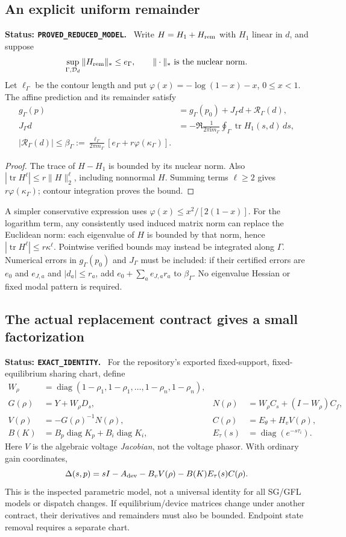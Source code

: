 \documentclass[11pt]{article}
\newcommand{\diag}{\operatorname{diag}}
\newcommand{\ii}{\mathrm{i}}
\newcommand{\status}[1]{\par\smallskip\noindent\textbf{Status: \texttt{#1}.}\ }
\begin{document}
\subsection{An explicit uniform remainder}
\status{PROVED\_REDUCED\_MODEL}
Write $H=H_1+H_{\rm rem}$ with $H_1$ linear in $d$, and suppose
\[
 \sup_{\Gamma,\mathcal D_d}\|H_{\rm rem}\|_*
 \le e_\Gamma,\qquad \|\cdot\|_* \text{ is the nuclear norm}.
\]
Let $\ell_\Gamma$ be the contour length and put
$\varphi(x)=-\log(1-x)-x$, $0\le x<1$.
The affine prediction and its remainder satisfy
\begin{align}
 g_\Gamma(p)&=g_\Gamma(p_0)+J_\Gamma d+\mathcal R_\Gamma(d),\\
 J_\Gamma d&=-\Re\frac{1}{2\pi\ii m_\Gamma}
                     \oint_\Gamma\operatorname{tr}H_1(s,d)\,ds,\\
 \boxed{|\mathcal R_\Gamma(d)|\le\beta_\Gamma
 :=\frac{\ell_\Gamma}{2\pi m_\Gamma}
       [e_\Gamma+r\varphi(\kappa_\Gamma)] .}
 \label{eq:regional-remainder}
\end{align}
\begin{proof}
The trace of $H-H_1$ is bounded by its nuclear norm.
Also $|\operatorname{tr}H^\ell|\le r\|H\|_2^\ell$,
including nonnormal $H$. Summing terms $\ell\ge2$ gives
$r\varphi(\kappa_\Gamma)$; contour integration proves the bound.
\end{proof}
A simpler conservative expression uses
$\varphi(x)\le x^2/[2(1-x)]$.
For the logarithm term, any consistently used induced matrix norm
can replace the Euclidean norm: each eigenvalue of $H$ is bounded
by that norm, hence $|\operatorname{tr}H^\ell|\le r\kappa^\ell$.
Pointwise verified bounds may instead be integrated along $\Gamma$.
Numerical errors in $g_\Gamma(p_0)$ and $J_\Gamma$ must be included:
if their certified errors are $e_0$ and $e_{J,a}$ and
$|d_a|\le r_a$, add $e_0+\sum_a e_{J,a}r_a$ to $\beta_\Gamma$.
No eigenvalue Hessian or fixed modal pattern is required.

\subsection{The actual replacement contract gives a small factorization}
\status{EXACT\_IDENTITY}
For the repository's exported fixed-support, fixed-equilibrium sharing
chart, define
\begin{align*}
 W_\rho&=\diag(1-\rho_1,1-\rho_1,\ldots,1-\rho_n,1-\rho_n),\\
 G(\rho)&=Y+W_\rho D_s,&
 N(\rho)&=W_\rho C_s+(I-W_\rho)C_f,\\
 V(\rho)&=-G(\rho)^{-1}N(\rho),&
 C(\rho)&=E_\theta+H_vV(\rho),\\
 B(K)&=B_p\diag K_p+B_i\diag K_i,&
 E_\tau(s)&=\diag(e^{-s\tau_i}).
\end{align*}
Here $V$ is the algebraic voltage \emph{Jacobian}, not the voltage phasor.
With ordinary gain coordinates,
\[
 \Delta(s,p)=sI-A_{\rm dev}-B_vV(\rho)-B(K)E_\tau(s)C(\rho).
\]
This is the inspected parametric model, not a universal identity for
all SG/GFL models or dispatch changes. If equilibrium/device matrices
change under another contract, their derivatives and remainders must
also be bounded. Endpoint state removal requires a separate chart.
\end{document}
